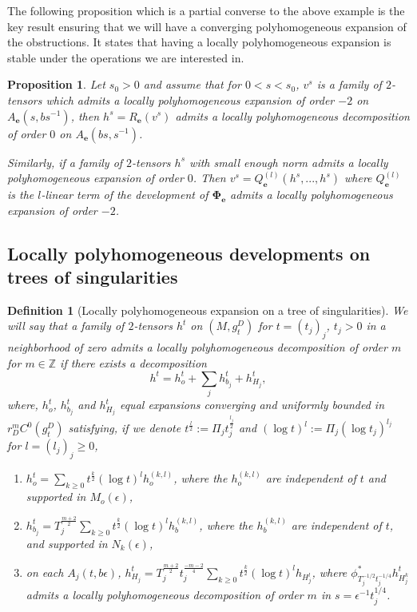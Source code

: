 \documentclass[12pt]{article}
\newtheorem{prop}[thm]{Proposition}
\newtheorem{defn}[thm]{Definition}
\begin{document}
    The following proposition which is a partial converse to the above example is the key result ensuring that we will have a converging polyhomogeneous expansion of the obstructions. It states that having a locally polyhomogeneous expansion is stable under the operations we are interested in.
    
    \begin{prop}\label{stabilité dvp par Rge et Qge}
        Let $s_0>0$ and assume that for $0<s<s_0$, $v^s$ is a family of $2$-tensors which admits a locally polyhomogeneous expansion of order $-2$ on $A_\mathbf{e}(s,bs^{-1})$, then $h^s = R_{\mathbf{e}}(v^s)$ admits a locally polyhomogeneous decomposition of order $0$ on $A_\mathbf{e}(bs,s^{-1})$.
        
        Similarly, if a family of $2$-tensors $h^s$ with small enough norm admits a locally polyhomogeneous expansion of order $0$. Then $v^s=Q^{(l)}_\mathbf{e}(h^s,...,h^s)$ where $Q^{(l)}_\mathbf{e}$ is the $l$-linear term of the development of $\mathbf{\Phi}_\mathbf{e}$ admits a locally polyhomogeneous expansion of order $-2$.
    \end{prop}
    \subsection{Locally polyhomogeneous developments on trees of singularities}


    \begin{defn}[Locally polyhomogeneous expansion on a tree of singularities]\label{homog expan tree}
        We will say that a family of $2$-tensors $h^t$ on $(M,g^D_t)$ for $t=(t_j)_j$, $t_j>0$ in a neighborhood of zero admits a \emph{locally polyhomogeneous decomposition of order $m$} for $m\in \mathbb{Z}$ if there exists a decomposition $$h^t = h^t_{o}+\sum_jh^t_{b_j} + h^t_{H_j},$$ where, $h^t_{o}$, $h^t_{b_j}$ and $h^t_{H_j}$ equal expansions converging and uniformly bounded in $r_D^mC^0(g^D_t)$ satisfying, if we denote $t^{\frac{l}{2}}:= \Pi_j t_j^{\frac{l_j}{2}}$ and $ (\log t)^l:= \Pi_j (\log t_j)^{l_j}$ for $l = (l_j)_j\geqslant 0$, 
        \begin{enumerate}
            \item $h^t_o = \sum_{k\geqslant 0} t^{\frac{k}{2}}(\log t)^lh_o^{(k,l)}$, where the $h_o^{(k,l)}$ are independent of $t$ and supported in $M_o(\epsilon)$,
            \item $h^t_{b_j} = T_j^{\frac{m+2}{2}}\sum_{k\geqslant 0} t^{\frac{k}{2}}(\log t)^lh_b^{(k,l)}$, where the $h_b^{(k,l)}$ are independent of $t$, and supported in $N_k(\epsilon)$,
            \item on each $A_j(t,b\epsilon)$, $h^t_{H_j} = T_j^{\frac{m+2}{2}}t_j^\frac{-m-2}{4} \sum_{k\geqslant 0}t^\frac{k}{2}(\log t)^lh_{H_j^l}$, where $\phi_{T_j^{-1/2}t_j^{-1/4}}^*h^t_{H_j^k}$ admits a locally polyhomogeneous decomposition of order $m$ in $s = \epsilon^{-1}t_j^{1/4}$.
        \end{enumerate}
    \end{defn}
    
\end{document}
